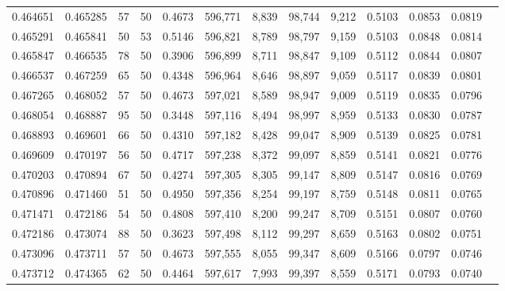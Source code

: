 \begin{tabular}{rrrrrrrrrrrrr}
0.464651 & 0.465285 &    57 &  50 &                                     0.4673 & 596,771 &   8,839 &  98,744 &   9,212 & 0.5103 & 0.0853 & 0.0819 \\
0.465291 & 0.465841 &    50 &  53 &                                     0.5146 & 596,821 &   8,789 &  98,797 &   9,159 & 0.5103 & 0.0848 & 0.0814 \\
0.465847 & 0.466535 &    78 &  50 &                                     0.3906 & 596,899 &   8,711 &  98,847 &   9,109 & 0.5112 & 0.0844 & 0.0807 \\
0.466537 & 0.467259 &    65 &  50 &                                     0.4348 & 596,964 &   8,646 &  98,897 &   9,059 & 0.5117 & 0.0839 & 0.0801 \\
0.467265 & 0.468052 &    57 &  50 &                                     0.4673 & 597,021 &   8,589 &  98,947 &   9,009 & 0.5119 & 0.0835 & 0.0796 \\
0.468054 & 0.468887 &    95 &  50 &                                     0.3448 & 597,116 &   8,494 &  98,997 &   8,959 & 0.5133 & 0.0830 & 0.0787 \\
0.468893 & 0.469601 &    66 &  50 &                                     0.4310 & 597,182 &   8,428 &  99,047 &   8,909 & 0.5139 & 0.0825 & 0.0781 \\
0.469609 & 0.470197 &    56 &  50 &                                     0.4717 & 597,238 &   8,372 &  99,097 &   8,859 & 0.5141 & 0.0821 & 0.0776 \\
0.470203 & 0.470894 &    67 &  50 &                                     0.4274 & 597,305 &   8,305 &  99,147 &   8,809 & 0.5147 & 0.0816 & 0.0769 \\
0.470896 & 0.471460 &    51 &  50 &                                     0.4950 & 597,356 &   8,254 &  99,197 &   8,759 & 0.5148 & 0.0811 & 0.0765 \\
0.471471 & 0.472186 &    54 &  50 &                                     0.4808 & 597,410 &   8,200 &  99,247 &   8,709 & 0.5151 & 0.0807 & 0.0760 \\
0.472186 & 0.473074 &    88 &  50 &                                     0.3623 & 597,498 &   8,112 &  99,297 &   8,659 & 0.5163 & 0.0802 & 0.0751 \\
0.473096 & 0.473711 &    57 &  50 &                                     0.4673 & 597,555 &   8,055 &  99,347 &   8,609 & 0.5166 & 0.0797 & 0.0746 \\
0.473712 & 0.474365 &    62 &  50 &                                     0.4464 & 597,617 &   7,993 &  99,397 &   8,559 & 0.5171 & 0.0793 & 0.0740 \\

\end{tabular}
